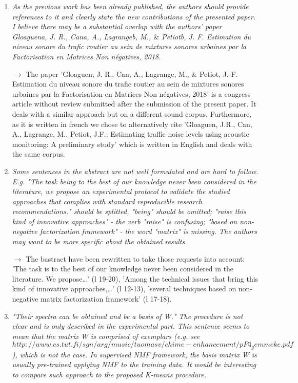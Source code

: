 \documentclass[10pt]{article}
\begin{document}
\begin{enumerate}
\item \emph{As the previous work has been already published, the authors should provide references to it and clearly state the new contributions of the presented paper. I believe there may be a substantial overlap with the authors' paper Gloaguena, J. R., Cana, A., Lagrangeb, M., $\&$ Petiotb, J. F. Estimation du niveau sonore du trafic routier au sein de mixtures sonores urbaines par la Factorisation en Matrices Non négatives, 2018.}

$\rightarrow$ The paper 'Gloaguen, J. R., Can, A., Lagrange, M., $\&$ Petiot, J. F. Estimation du niveau sonore du trafic routier au sein de mixtures sonores urbaines par la Factorisation en Matrices Non négatives, 2018' is a congress article without review submitted after the submission of the present paper. It deals with a similar approach but on a different sound corpus.  Furthermore, as it is written in french we chose to alternatively cite 'Gloaguen, J.R., Can, A., Lagrange, M., Petiot, J.F.: Estimating traffic noise levels using acoustic monitoring: A preliminary study' which is written in English and deals with the same corpus.


\item \emph{Some sentences in the abstract are not well formulated and are hard to follow. E.g. "The task being to the best of our knowledge never been considered in the literature, we propose an experimental protocol to validate the studied approaches that complies with standard reproducible research recommendations." should be splitted, "being" should be omitted; "raise this kind of innovative approaches" - the verb "raise" is confusing; "based on non-negative factorization framework" - the word "matrix" is missing. The authors may want to be more specific about the obtained results.}

$\rightarrow$ The bastract have been rewritten to take those requests into account: 'The task is to the best of our knowledge never been considered in the literature. We propose\dots' (l 19-20), 'Among the technical issues that bring this kind of innovative approaches,\dots ' (l 12-13), 'several techniques based on non-negative matrix  factorization framework' (l 17-18).

\item \emph{"Their spectra can be obtained and be a basis of W." The procedure is not clear and is only described in the experimental part. This sentence seems to mean that the matrix W is comprised of exemplars (e.g. see $http://www.cs.tut.fi/sgn/arg/music/tuomasv/chime-enhancement/pP4_gemmeke.pdf$), which is not the case. In supervised NMF framework, the basis matrix W is usually pre-trained applying NMF to the training data. It would be interesting to compare such approach to the proposed K-means procedure.}


\end{enumerate}
\end{document}
